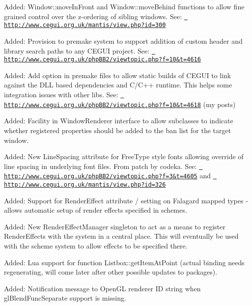 \begin{DoxyItemize}
\item Added\+: Window\+::move\+In\+Front and Window\+::move\+Behind functions to allow fine grained control over the z-\/ordering of sibling windows. See\+: \href{http://www.cegui.org.uk/mantis/view.php?id=300}{\texttt{ http\+://www.\+cegui.\+org.\+uk/mantis/view.\+php?id=300}}
\item Added\+: Provision to premake system to support addition of custom header and library search paths to any C\+E\+G\+UI project. See\+: \href{http://www.cegui.org.uk/phpBB2/viewtopic.php?f=10&t=4616}{\texttt{ http\+://www.\+cegui.\+org.\+uk/php\+B\+B2/viewtopic.\+php?f=10\&t=4616}}
\item Added\+: Add option in premake files to allow static builds of C\+E\+G\+UI to link against the D\+LL based dependencies and C/\+C++ runtime. This helps some integration issues with other libs. See\+: \href{http://www.cegui.org.uk/phpBB2/viewtopic.php?f=10&t=4618}{\texttt{ http\+://www.\+cegui.\+org.\+uk/php\+B\+B2/viewtopic.\+php?f=10\&t=4618}} (my posts)
\item Added\+: Facility in Window\+Renderer interface to allow subclasses to indicate whether registered properties should be added to the \textquotesingle{}ban\textquotesingle{} list for the target window.
\item Added\+: New Line\+Spacing attribute for Free\+Type style fonts allowing override of line spacing in underlying font files. From patch by \textquotesingle{}codeka\textquotesingle{}. See\+: \href{http://www.cegui.org.uk/phpBB2/viewtopic.php?f=3&t=4605}{\texttt{ http\+://www.\+cegui.\+org.\+uk/php\+B\+B2/viewtopic.\+php?f=3\&t=4605}} and \href{http://www.cegui.org.uk/mantis/view.php?id=326}{\texttt{ http\+://www.\+cegui.\+org.\+uk/mantis/view.\+php?id=326}}
\item Added\+: Support for \textquotesingle{}Render\+Effect\textquotesingle{} attribute / setting on Falagard mapped types -\/ allows automatic setup of render effects specified in schemes.
\item Added\+: New Render\+Effect\+Manager singleton to act as a means to register Render\+Effects with the system in a central place. This will eventually be used with the scheme system to allow effects to be specified there.
\item Added\+: Lua support for function Listbox\+::get\+Item\+At\+Point (actual binding needs regenerating, will come later after other possible updates to packages).
\item Added\+: Notification message to Open\+GL renderer ID string when gl\+Blend\+Func\+Separate support is missing.

\end{DoxyItemize}
